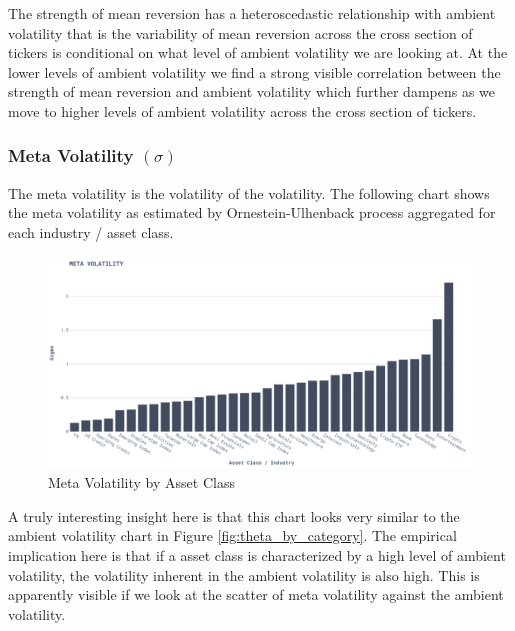 The strength of mean reversion has a heteroscedastic relationship with ambient volatility that is the variability of mean reversion across the cross section of tickers is conditional on what level of ambient volatility we are looking at.  At the lower levels of ambient volatility we find a strong visible correlation between the strength of mean reversion and ambient volatility which further dampens as we move to higher levels of ambient volatility across the cross section of tickers.



\subsubsection{ Meta Volatility $(\sigma)$  }

The meta volatility is the volatility of the volatility. The following chart shows the meta volatility as estimated by Ornestein-Ulhenback process aggregated for each industry / asset class.

\begin{figure}[H]
    \centering
    \includegraphics[width=\textwidth]{images/meta_volatility_by_category.png}
    \caption{Meta Volatility by Asset Class}
    \label{fig:figure_label}
\end{figure}

A truly interesting insight here is that this chart looks very similar to the ambient volatility chart in Figure \ref{fig:theta_by_category}. The empirical implication here is that if a asset class is characterized by a high level of ambient volatility, the volatility inherent in the ambient volatility is also high. This is apparently visible if we  look at the scatter of meta volatility against the ambient volatility.

